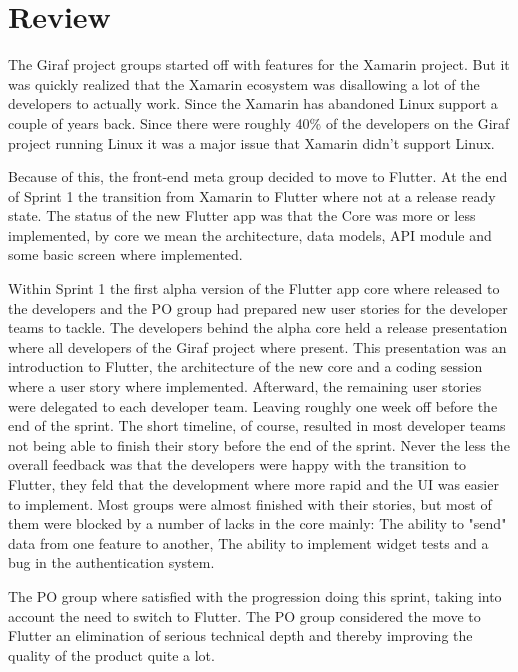 \section{Review}
The Giraf project groups started off with features for the Xamarin project. But it was quickly realized that the Xamarin ecosystem was disallowing a lot of the developers to actually work. Since the Xamarin has abandoned Linux support a couple of years back. Since there were roughly 40\% of the developers on the Giraf project running Linux it was a major issue that Xamarin didn't support Linux.

Because of this, the front-end meta group decided to move to Flutter. At the end of Sprint 1 the transition from Xamarin to Flutter where not at a release ready state. The status of the new Flutter app was that the Core was more or less implemented, by core we mean the architecture, data models, API module and some basic screen where implemented.

Within Sprint 1 the first alpha version of the Flutter app core where released to the developers and the PO group had prepared new user stories for the developer teams to tackle. The developers behind the alpha core held a release presentation where all developers of the Giraf project where present. This presentation was an introduction to Flutter, the architecture of the new core and a coding session where a user story where implemented. Afterward, the remaining user stories were delegated to each developer team. Leaving roughly one week off before the end of the sprint. The short timeline, of course, resulted in most developer teams not being able to finish their story before the end of the sprint. Never the less the overall feedback was that the developers were happy with the transition to Flutter, they feld that the development where more rapid and the UI was easier to implement. Most groups were almost finished with their stories, but most of them were blocked by a number of lacks in the core mainly: The ability to "send" data from one feature to another, The ability to implement widget tests and a bug in the authentication system.

The PO group where satisfied with the progression doing this sprint, taking into account the need to switch to Flutter. The PO group considered the move to Flutter an elimination of serious technical depth and thereby improving the quality of the product quite a lot.